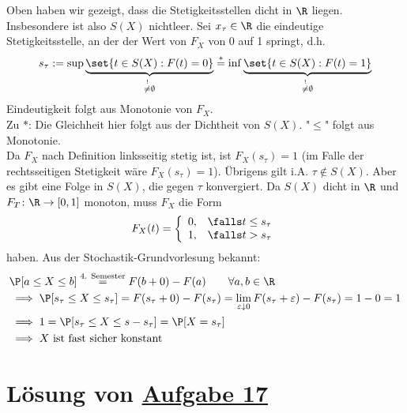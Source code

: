 Oben haben wir gezeigt, dass die Stetigkeitsstellen dicht in $\R$ liegen.
Insbesondere ist also $S(X)$ nichtleer.
Sei $x_\tau\in\R$ die eindeutige Stetigkeitsstelle, an der der Wert von $F_X$ von 0 auf 1 springt, d.h.
\begin{align*}
	s_\tau:=\sup\underbrace{\set{t\in S(X):F(t)=0}}_{
		\overset{!}{\neq}\emptyset
	}
	\overset{\ast}{=}
	\inf\underbrace{\set{t\in S(X):F(t)=1}}_{
		\overset{!}{\neq}\emptyset
	}
\end{align*}
Eindeutigkeit folgt aus Monotonie von $F_X$.\\
Zu $\ast$: Die Gleichheit hier folgt aus der Dichtheit von $S(X)$.
"$\leq$" folgt aus Monotonie.\\
Da $F_X$ nach Definition linksseitig stetig ist, ist $F_X(s_\tau)=1$ (im Falle der rechtsseitigen Stetigkeit wäre $F_X(s_\tau)=1$).
Übrigens gilt i.A. $\tau\not\in S(X)$.
Aber es gibt eine Folge in $S(X)$, die gegen $\tau$ konvergiert.
Da $S(X)$ dicht in $\R$ und $F_T\colon\R\to[0,1]$ monoton, muss $F_X$ die Form
\begin{align*}
	F_X(t)=\left\lbrace\begin{array}{cl}
		0, &\falls t\leq s_\tau\\
		1, &\falls t> s_\tau
	\end{array}\right.
\end{align*}
haben.
Aus der Stochastik-Grundvorlesung bekannt:
\begin{align*}
	&\P[a\leq X\leq b]
	\overset{\text{4. Semester}}{=}
	F(b+0)-F(a)\qquad\forall a,b\in\R\\
	&\implies
	\P[s_\tau\leq X\leq s_\tau]
	=
	F(s_\tau+0)-F(s_\tau)
	=\lim\limits_{\varepsilon\downarrow0} F(s_\tau+\varepsilon)-F(s_\tau)
	=1-0=1\\
	&\implies
	1=\P[s_\tau\leq X\leq s-s_\tau]=\P[X=s_\tau]\\
	&\implies
	X\text{ ist fast sicher konstant}
\end{align*}

\section{Lösung von 
	\texorpdfstring{\hyperref[aufg:17]{Aufgabe 17}}{}
}\label{loes:17}

